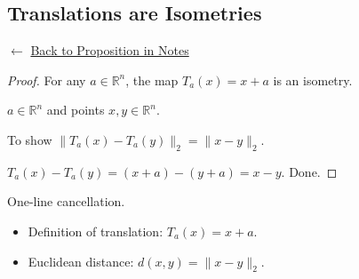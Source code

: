 
\subsection*{Translations are Isometries}
\label{prf:translations-are-isometries}

\begin{remark*}[Return]
$\leftarrow$ \hyperref[prop:translations-are-isometries]{Back to Proposition in Notes}
\end{remark*}

\begin{proof}
\Claim For any $a \in \mathbb{R}^n$, the map $T_a(x) = x + a$ is an isometry.

\Given $a \in \mathbb{R}^n$ and points $x, y \in \mathbb{R}^n$.

\Goal To show $\|T_a(x) - T_a(y)\|_2 = \|x - y\|_2$.

\Strategy $T_a(x) - T_a(y) = (x+a) - (y+a) = x - y$. Done.


\end{proof}

\begin{remark*}
One-line cancellation.
\end{remark*}

\begin{remark*}[Dependencies]
\begin{itemize}
  \item Definition of translation: $T_a(x) = x + a$.
  \item Euclidean distance: $d(x,y) = \|x-y\|_2$.
\end{itemize}
\end{remark*}
